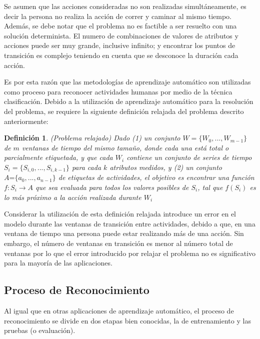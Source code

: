 Se asumen que las acciones consideradas no son realizadas simultáneamente,
es decir la persona no realiza la acción de correr y caminar al mismo
tiempo. Además, se debe notar que el problema  no es factible
a ser resuelto con una solución determinista. El numero de combinaciones
de valores de atributos y acciones puede ser muy grande, inclusive
infinito; y encontrar los puntos de transición es complejo teniendo
en cuenta que se desconoce la duración cada acción. 

Es por esta razón que las metodologías de aprendizaje automático son
utilizadas como proceso para reconocer actividades humanas por medio
de la técnica clasificación. Debido a la utilización de aprendizaje
automático para la resolución del problema, se requiere la siguiente
definición relajada del problema  descrito anteriormente: 

\newtheorem{defi}{Definición}

\begin{defi}(Problema  relajado) Dado (1) un conjunto
$W=\{W_{0},...,W_{m-1}\}$ de $m$ ventanas de tiempo del mismo tamaño,
donde cada una está total o parcialmente etiquetada, y que cada $W_{i}$
contiene un conjunto de series de tiempo $S_{i}=\{S_{i,0},...,S_{i,k-1}\}$
para cada $k$ atributos medidos, y (2) un conjunto $A\text{=}\{a_{0},...,a_{n-1}\}$
de etiquetas de actividades, el objetivo es encontrar una función
$f\colon S_{i}\rightarrow A$ que sea evaluada para todos los valores
posibles de $S_{i}$, tal que $f(S_{i})$ es lo más próximo a la acción
realizada durante $W_{i}$ \end{defi}

Considerar la utilización de esta definición relajada introduce un
error en el modelo durante las ventanas de transición entre actividades,
debido a que, en una ventana de tiempo una persona puede estar realizando
más de una acción. Sin embargo, el número de ventanas en transición
es menor al número total de ventanas por lo que el error introducido
por relajar el problema no es significativo para la mayoría de las
aplicaciones.

\subsection{Proceso de Reconocimiento }

\label{sec262:proceso-har}Al igual que en otras aplicaciones de aprendizaje
automático, el proceso de reconocimiento se divide en dos etapas bien
conocidas, la de entrenamiento y las pruebas (o evaluación).


